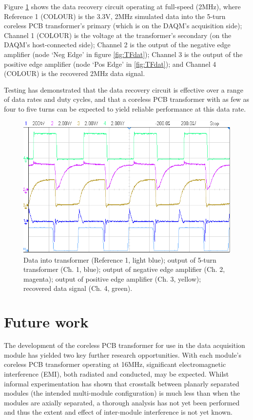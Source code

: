 \documentclass[conference]{IEEEtran}
\begin{document}
	Figure \ref{fig:Data} shows the data recovery circuit operating at full-speed (2MHz), where Reference 1 (COLOUR) is the 3.3V, 2MHz simulated data into the 5-turn coreless PCB transformer's primary (which is on the DAQM's acquisition side); Channel 1 (COLOUR) is the voltage at the transformer's secondary (on the DAQM's host-connected side); Channel 2 is the output of the negative edge amplifier (node `Neg Edge' in figure \ref{fig:TFdat}); Channel 3 is the output of the positive edge amplifier (node `Pos Edge' in \ref{fig:TFdat}); and Channel 4 (COLOUR) is the recovered 2MHz data signal.
	
	Testing has demonstrated that the data recovery circuit is effective over a range of data rates and duty cycles, and that a coreless PCB transformer with as few as four to five turns can be expected to yield reliable performance at this data rate.
	
	\begin{figure}[t]
		\centering
		\includegraphics[width=1\columnwidth]{./img/2M_Cropped}
		\caption{Data into transformer (Reference 1, light blue); output of 5-turn transformer (Ch. 1, blue); output of negative edge amplifier (Ch. 2, magenta); output of positive edge amplifier (Ch. 3, yellow); recovered data signal (Ch. 4, green).}
		\label{fig:Data}
	\end{figure}

\section{Future work}
The development of the coreless PCB transformer for use in the data acquisition module has yielded two key further research opportunities.  
With each module's coreless PCB transformer operating at 16MHz, significant electromagnetic interference (EMI), both radiated and conducted, may be expected.  Whilst informal experimentation has shown that crosstalk between planarly separated modules (the intended multi-module configuration) is much less than when the modules are axially separated, a thorough analysis has not yet been performed and thus the extent and effect of inter-module interference is not yet known.  
\end{document}
